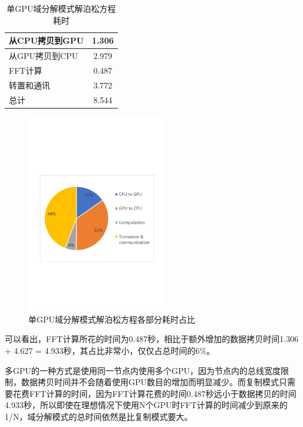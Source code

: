\begin{table}[!htbp]
    \centering
    \footnotesize%
    \setlength{\tabcolsep}{4pt}%
    \renewcommand{\arraystretch}{1.2}%
    \caption{单GPU域分解模式解泊松方程耗时}
    \begin{tabular}{lc}
        \hline\hline
        从CPU拷贝到GPU    & 1.306     \\
        \hline
        从GPU拷贝到CPU    & 2.979     \\
        \hline
        FFT计算                       & 0.487     \\
        \hline
        转置和通讯                  & 3.772     \\
        \hline
        总计                              & 8.544    \\
        \hline\hline
    \end{tabular}
    \label{tab:1GPU_Poisson}
\end{table}

\begin{figure}[!htb]
    \centering
    \includegraphics[width=0.55\textwidth]{Img/domain_decomposition_1GPU.pdf}
    \caption{单GPU域分解模式解泊松方程各部分耗时占比}\label{fig:1GPU_Poisson}
\end{figure}

可以看出，FFT计算所花的时间为0.487秒，相比于额外增加的数据拷贝时间1.306 + 4.627 = 4.933秒，其占比非常小，仅仅占总时间的6\%。

多GPU的一种方式是使用同一节点内使用多个GPU，因为节点内的总线宽度限制，数据拷贝时间并不会随着使用GPU数目的增加而明显减少。而复制模式只需要花费FFT计算的时间，因为FFT计算花费的时间0.487秒远小于数据拷贝的时间4.933秒，所以即使在理想情况下使用N个GPU时FFT计算的时间减少到原来的1/N，域分解模式的总时间依然是比复制模式要大。

